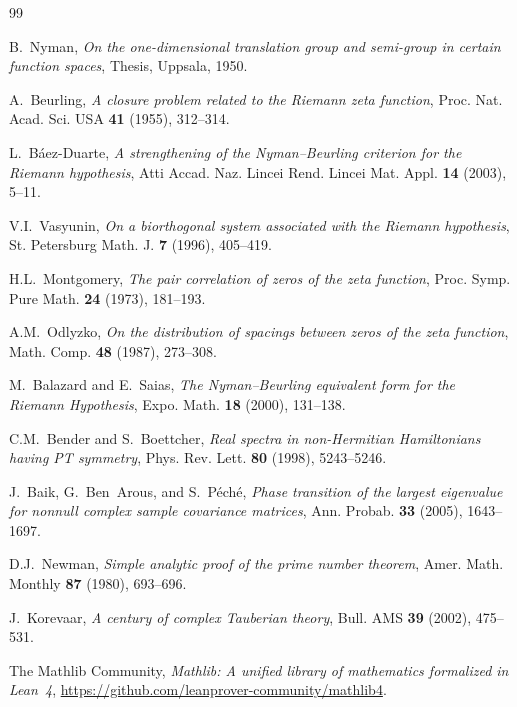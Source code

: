 \documentclass[11pt,a4paper]{article}
\begin{document}
\begin{thebibliography}{99}

B.~Nyman, \emph{On the one-dimensional translation group and semi-group in
certain function spaces}, Thesis, Uppsala, 1950.

A.~Beurling, \emph{A closure problem related to the Riemann zeta function},
Proc. Nat. Acad. Sci. USA \textbf{41} (1955), 312--314.

L.~B\'aez-Duarte, \emph{A strengthening of the Nyman--Beurling criterion for
the Riemann hypothesis}, Atti Accad. Naz. Lincei Rend. Lincei Mat. Appl.
\textbf{14} (2003), 5--11.

V.I.~Vasyunin, \emph{On a biorthogonal system associated with the Riemann
hypothesis}, St. Petersburg Math. J. \textbf{7} (1996), 405--419.

H.L.~Montgomery, \emph{The pair correlation of zeros of the zeta function},
Proc. Symp. Pure Math. \textbf{24} (1973), 181--193.

A.M.~Odlyzko, \emph{On the distribution of spacings between zeros of the zeta
function}, Math. Comp. \textbf{48} (1987), 273--308.

M.~Balazard and E.~Saias, \emph{The Nyman--Beurling equivalent form for the
Riemann Hypothesis}, Expo. Math. \textbf{18} (2000), 131--138.

C.M.~Bender and S.~Boettcher, \emph{Real spectra in non-Hermitian
Hamiltonians having PT symmetry}, Phys. Rev. Lett. \textbf{80} (1998),
5243--5246.

J.~Baik, G.~Ben~Arous, and S.~P\'ech\'e, \emph{Phase transition of the
largest eigenvalue for nonnull complex sample covariance matrices},
Ann. Probab. \textbf{33} (2005), 1643--1697.

D.J.~Newman, \emph{Simple analytic proof of the prime number theorem},
Amer. Math. Monthly \textbf{87} (1980), 693--696.

J.~Korevaar, \emph{A century of complex Tauberian theory},
Bull. AMS \textbf{39} (2002), 475--531.

The Mathlib Community, \emph{Mathlib: A unified library of mathematics
formalized in Lean~4}, \url{https://github.com/leanprover-community/mathlib4}.

\end{thebibliography}
\end{document}
